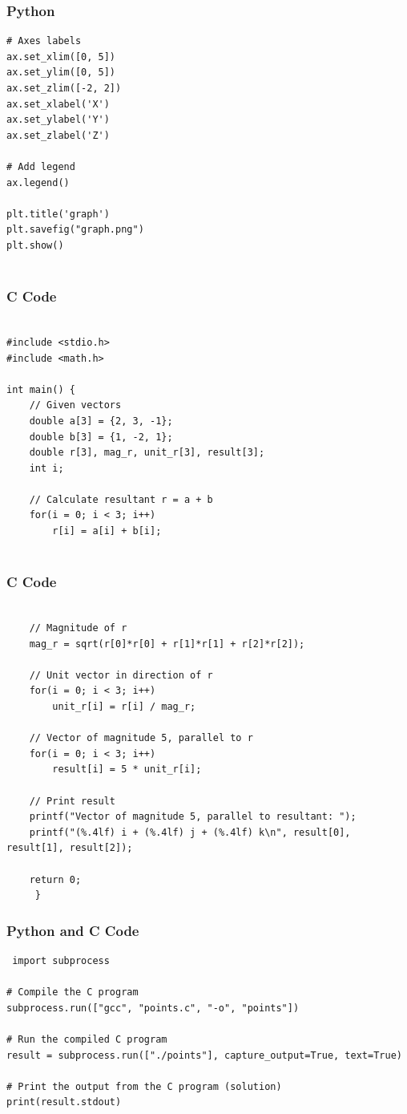 \documentclass{beamer}
\begin{document}
\begin{frame}[fragile]
    \frametitle{Python}
    \begin{lstlisting}
# Axes labels
ax.set_xlim([0, 5])
ax.set_ylim([0, 5])
ax.set_zlim([-2, 2])
ax.set_xlabel('X')
ax.set_ylabel('Y')
ax.set_zlabel('Z')

# Add legend
ax.legend()

plt.title('graph')
plt.savefig("graph.png") 
plt.show()


\end{lstlisting}
\end{frame}


\begin{frame}[fragile]
\frametitle{C Code}
\begin{lstlisting}
  
#include <stdio.h>
#include <math.h>

int main() {
    // Given vectors
    double a[3] = {2, 3, -1};
    double b[3] = {1, -2, 1};
    double r[3], mag_r, unit_r[3], result[3];
    int i;

    // Calculate resultant r = a + b
    for(i = 0; i < 3; i++)
        r[i] = a[i] + b[i];


 \end{lstlisting}
\end{frame} 


\begin{frame}[fragile]
\frametitle{C Code}
\begin{lstlisting}
    
    // Magnitude of r
    mag_r = sqrt(r[0]*r[0] + r[1]*r[1] + r[2]*r[2]);

    // Unit vector in direction of r
    for(i = 0; i < 3; i++)
        unit_r[i] = r[i] / mag_r;

    // Vector of magnitude 5, parallel to r
    for(i = 0; i < 3; i++)
        result[i] = 5 * unit_r[i];

    // Print result
    printf("Vector of magnitude 5, parallel to resultant: ");
    printf("(%.4lf) i + (%.4lf) j + (%.4lf) k\n", result[0], result[1], result[2]);

    return 0;
     }

\end{lstlisting}
\end{frame}

\begin{frame}[fragile]
\frametitle{Python and C Code}

\begin{lstlisting}
 import subprocess

# Compile the C program
subprocess.run(["gcc", "points.c", "-o", "points"])

# Run the compiled C program
result = subprocess.run(["./points"], capture_output=True, text=True)

# Print the output from the C program (solution)
print(result.stdout) 

\end{lstlisting}
\end{frame}
\end{document}
